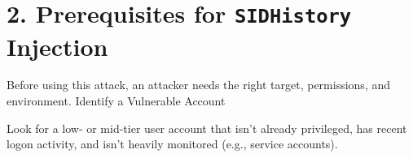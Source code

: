 \section{2. Prerequisites for \texttt{SIDHistory} Injection}
Before using this attack, an attacker needs the right target, permissions, and environment.
Identify a Vulnerable Account

 Look for a low- or mid-tier user account that isn’t already privileged, has recent logon activity, and isn’t heavily monitored (e.g., service accounts).
